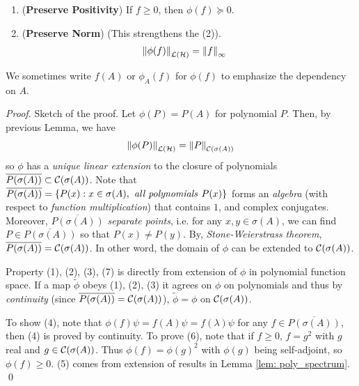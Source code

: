 \documentclass[11pt]{article}
\begin{document}
\begin{itemize}
\begin{theorem}
\begin{enumerate}
\item (\textbf{Preserve Positivity})  If $f \ge 0$, then $\phi(f) \succeq 0$. 
\item (\textbf{Preserve Norm}) (This strengthens the (2)).
\begin{align}
\left\|\phi(f)\right\|_{{\mathcal L}({\mathcal H})} &= \left\|f\right\|_{\infty} \label{eqn: cont_functional_calculas_norm_preserve}
\end{align}
\end{enumerate} We sometimes write $f(A)$ or $\phi_{A}(f)$ for $\phi(f)$ to emphasize the dependency on $A$.
\end{theorem}
\begin{proof}
Sketch of the proof. Let $\phi(P) = P(A)$ for polynomial $P$. Then, by previous Lemma, we have
\begin{align*}
\left\|\phi(P)\right\|_{{\mathcal L}({\mathcal H})} = \left\|P\right\|_{{\mathcal C}(\sigma(A))}
\end{align*} so $\phi$ has a \emph{unique linear extension} to the closure of polynomials $\overline{P(\sigma(A))} \subset {\mathcal C}(\sigma(A))$.  Note that $\overline{P(\sigma(A))} = \left\{P(x): x \in\sigma(A), \text{\emph{ all polynomials }}P(x) \right\}$ forms an \emph{algebra} (with respect to \emph{function multiplication}) that contains $1$, and complex conjugates. Moreover, $\overline{P(\sigma(A))}$ \emph{separate points}, i.e. for any $x, y \in \sigma(A)$, we can find $P \in \overline{P(\sigma(A))}$ so that $P(x) \neq P(y)$. By, \emph{Stone-Weierstrass theorem}, $\overline{P(\sigma(A))} = {\mathcal C}(\sigma(A))$. In other word, the domain of $\phi$ can be extended to ${\mathcal C}(\sigma(A))$. 

Property (1), (2), (3), (7) is directly from extension of $\phi$ in polynomial function space. If a map $\widetilde{\phi}$ obeys (1), (2), (3) it agrees on $\phi$ on polynomials and thus by \emph{continuity} (since $\overline{P(\sigma(A))} = {\mathcal C}(\sigma(A))$), $\widetilde{\phi} = \phi$ on ${\mathcal C}(\sigma(A))$. 

To show (4), note that $\phi(f)\psi = f(A)\psi= f(\lambda) \psi$ for any $f \in \overline{P(\sigma(A))}$, then (4) is proved by continuity. To prove (6), note that if $f \ge 0$, $f = g^2$ with $g$ real and $g \in {\mathcal C}(\sigma(A))$. Thus $\phi(f) = \phi(g)^2$ with $\phi(g)$ being self-adjoint, so $\phi(f) \ge 0$.  (5) comes from extension of results in Lemma \ref{lem: poly_spectrum}. \qed
\end{proof}


\end{itemize}
\end{document}
